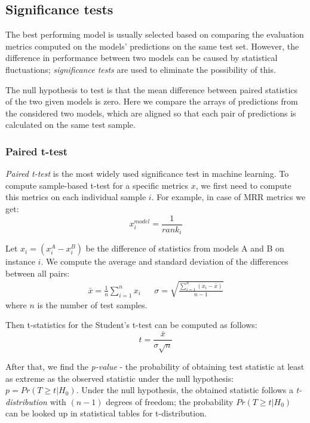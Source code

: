 \subsection{Significance tests}

The best performing model is usually selected based on comparing the evaluation metrics computed on the models' predictions on the same test set. However, the difference in performance between two models can be caused by statistical fluctuations; \textit{significance tests} are used to eliminate the possibility of this.

The null hypothesis to test is that the mean difference between paired statistics of the two given models is zero. Here we compare the arrays of predictions from the considered two models, which are aligned so that each pair of predictions is calculated on the same test sample. 

\subsubsection{Paired t-test}

\textit{Paired t-test} is the most widely used significance test in machine learning. To compute sample-based t-test for a specific metrics $x$, we first need to compute this metrics on each individual sample $i$. For example, in case of MRR metrics we get:
\begin{equation}
    x^{model}_i = \frac{1}{rank_i}
\end{equation}

Let $x_i = (x_i^A - x_i^B)$ be the difference of statistics from models A and B on instance $i$. We compute the average and standard deviation of the differences between all pairs:
\begin{align}
    \bar{x} = \frac{1}{n}\sum_{i=1}^n x_i && \sigma = \sqrt{\frac{\sum_{i=1}^n (x_i - \bar{x})}{n-1}}
    \label{sig_1}
\end{align}
where $n$ is the number of test samples.

Then t-statistics for the Student's t-test can be computed as follows:
\begin{equation}
    t = \frac{\bar{x}}{\sigma \sqrt{n}}
    \label{sig_2}
\end{equation}

After that, we find the \textit{p-value} - the probability of obtaining test statistic at least as extreme as the observed statistic under the null hypothesis: $p = Pr(T \ge t| H_0)$. Under the null hypothesis, the obtained statistic follows a \textit{t-distribution} with $(n-1)$ degrees of freedom; the probability $Pr(T \ge t| H_0)$ can be looked up in statistical tables for t-distribution.

